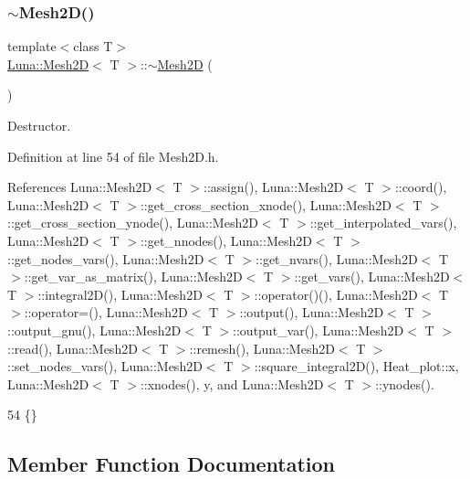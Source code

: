 \subsubsection{\texorpdfstring{$\sim$\+Mesh2\+D()}{~Mesh2D()}}
{\footnotesize\ttfamily template$<$class T$>$ \\
\hyperlink{classLuna_1_1Mesh2D}{Luna\+::\+Mesh2D}$<$ T $>$\+::$\sim$\hyperlink{classLuna_1_1Mesh2D}{Mesh2D} (\begin{DoxyParamCaption}{ }\end{DoxyParamCaption})\hspace{0.3cm}{\ttfamily [inline]}}



Destructor. 



Definition at line 54 of file Mesh2\+D.\+h.



References Luna\+::\+Mesh2\+D$<$ T $>$\+::assign(), Luna\+::\+Mesh2\+D$<$ T $>$\+::coord(), Luna\+::\+Mesh2\+D$<$ T $>$\+::get\+\_\+cross\+\_\+section\+\_\+xnode(), Luna\+::\+Mesh2\+D$<$ T $>$\+::get\+\_\+cross\+\_\+section\+\_\+ynode(), Luna\+::\+Mesh2\+D$<$ T $>$\+::get\+\_\+interpolated\+\_\+vars(), Luna\+::\+Mesh2\+D$<$ T $>$\+::get\+\_\+nnodes(), Luna\+::\+Mesh2\+D$<$ T $>$\+::get\+\_\+nodes\+\_\+vars(), Luna\+::\+Mesh2\+D$<$ T $>$\+::get\+\_\+nvars(), Luna\+::\+Mesh2\+D$<$ T $>$\+::get\+\_\+var\+\_\+as\+\_\+matrix(), Luna\+::\+Mesh2\+D$<$ T $>$\+::get\+\_\+vars(), Luna\+::\+Mesh2\+D$<$ T $>$\+::integral2\+D(), Luna\+::\+Mesh2\+D$<$ T $>$\+::operator()(), Luna\+::\+Mesh2\+D$<$ T $>$\+::operator=(), Luna\+::\+Mesh2\+D$<$ T $>$\+::output(), Luna\+::\+Mesh2\+D$<$ T $>$\+::output\+\_\+gnu(), Luna\+::\+Mesh2\+D$<$ T $>$\+::output\+\_\+var(), Luna\+::\+Mesh2\+D$<$ T $>$\+::read(), Luna\+::\+Mesh2\+D$<$ T $>$\+::remesh(), Luna\+::\+Mesh2\+D$<$ T $>$\+::set\+\_\+nodes\+\_\+vars(), Luna\+::\+Mesh2\+D$<$ T $>$\+::square\+\_\+integral2\+D(), Heat\+\_\+plot\+::x, Luna\+::\+Mesh2\+D$<$ T $>$\+::xnodes(), y, and Luna\+::\+Mesh2\+D$<$ T $>$\+::ynodes().


\begin{DoxyCode}
54 \{\}
\end{DoxyCode}


\subsection{Member Function Documentation}
\mbox{\label{classLuna_1_1Mesh2D_a4f0219cbe058c1610af4b358c384f3d2}} 
